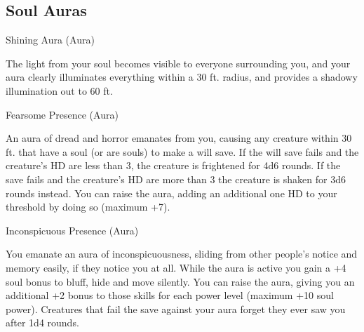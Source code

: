 \subsection{Soul Auras}

\begin{soulpower}{Shining Aura (Aura)}
  \components{-}
  \rangepersonal

  The light from your soul becomes visible to everyone surrounding you, and
  your aura clearly illuminates everything within a 30 ft. radius, and
  provides a shadowy illumination out to 60 ft.
\end{soulpower}

\begin{soulpower}{Fearsome Presence (Aura)}
  \components{-}

  An aura of dread and horror emanates from you, causing any creature within
  30 ft. that have a soul (or are souls) to make a will save. If the will save
  fails and the creature's HD are less than 3, the creature is frightened for
  4d6 rounds. If the save fails and the creature's HD are more than 3 the
  creature is shaken for 3d6 rounds instead. You can raise the aura, adding an
  additional one HD to your threshold by doing so (maximum +7).
\end{soulpower}

\begin{soulpower}{Inconspicuous Presence (Aura)}

  \components{-}
  \rangepersonal

  You emanate an aura of inconspicuousness, sliding from other people's notice
  and memory easily, if they notice you at all. While the aura is active you
  gain a +4 soul bonus to bluff, hide and move silently. You can raise the
  aura, giving you an additional +2 bonus to those skills for each power level
  (maximum +10 soul power). Creatures that fail the save against your aura
  forget they ever saw you after 1d4 rounds.
\end{soulpower}
